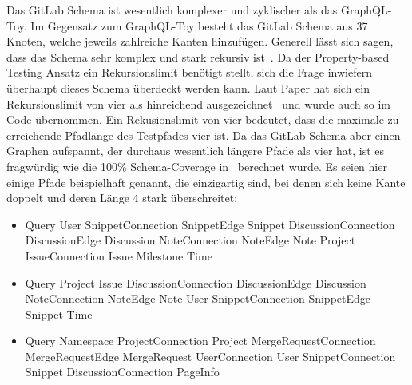 Das GitLab Schema ist wesentlich komplexer und zyklischer als das GraphQL-Toy.
Im Gegensatz zum GraphQL-Toy besteht das GitLab Schema aus 37 Knoten, welche jeweils zahlreiche Kanten hinzufügen.
Generell lässt sich sagen, dass das Schema sehr komplex und stark rekursiv ist~\cite[vgl. Studied Cases 2]{property-based-testing}.
Da der Property-based Testing Ansatz ein Rekursionslimit benötigt stellt, sich die Frage inwiefern überhaupt dieses Schema überdeckt werden kann.
Laut Paper hat sich ein Rekursionslimit von vier als hinreichend ausgezeichnet~\cite[vgl. Table 1 ]{property-based-testing} und wurde auch so im Code übernommen.
Ein Rekusionslimit von vier bedeutet, dass die maximale zu erreichende Pfadlänge des Testpfades vier ist.
Da das GitLab-Schema aber einen Graphen aufspannt, der durchaus wesentlich längere Pfade als vier hat, ist es fragwürdig wie die 100\% Schema-Coverage in~\cite[Table 1]{property-based-testing} berechnet wurde.
Es seien hier einige Pfade beispielhaft genannt, die einzigartig sind, bei denen sich keine Kante doppelt und deren Länge 4 stark überschreitet: \\

\begin{itemize}
    \item Query \textrightarrow User \textrightarrow SnippetConnection \textrightarrow SnippetEdge \textrightarrow Snippet \textrightarrow DiscussionConnection \textrightarrow DiscussionEdge \textrightarrow Discussion \textrightarrow NoteConnection \textrightarrow NoteEdge \textrightarrow Note \textrightarrow Project \textrightarrow IssueConnection \textrightarrow Issue \textrightarrow Milestone \textrightarrow Time
    \item Query \textrightarrow Project \textrightarrow Issue \textrightarrow DiscussionConnection \textrightarrow DiscussionEdge \textrightarrow Discussion \textrightarrow NoteConnection \textrightarrow NoteEdge \textrightarrow Note \textrightarrow User \textrightarrow SnippetConnection \textrightarrow SnippetEdge \textrightarrow Snippet \textrightarrow Time \\
    \item Query \textrightarrow Namespace \textrightarrow ProjectConnection \textrightarrow Project \textrightarrow MergeRequestConnection \textrightarrow MergeRequestEdge \textrightarrow MergeRequest \textrightarrow UserConnection \textrightarrow User \textrightarrow SnippetConnection \textrightarrow Snippet \textrightarrow DiscussionConnection \textrightarrow PageInfo \\
\end{itemize}

